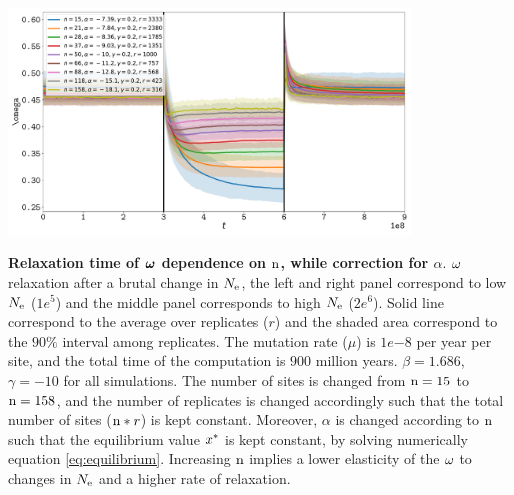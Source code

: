 \documentclass{article}
\begin{document}
\begin{center}
	\includegraphics[width=0.8\textwidth] {artworks/Relaxation-Stability-Alpha.pdf}
\end{center}
\textbf{Relaxation time of $\bm{\omega}$ dependence on $\text{n}$, while correction for $\alpha$}.
$\omega$ relaxation after a brutal change in $N_{\mathrm{e}}$, the left and right panel correspond to low $N_{\mathrm{e}}$ ($1e^{5}$) and the middle panel corresponds to high $N_{\mathrm{e}}$ ($2e^{6}$). 
Solid line correspond to the average over replicates ($r$) and the shaded area correspond to the $90\%$ interval among replicates. 
The mutation rate ($\mu$) is $1e{-8}$ per year per site, and the total time of the computation is $900$ million years.
$\beta=1.686$, $\gamma=-10$ for all simulations. The number of sites is changed from $\text{n}=15$ to $\text{n}=158$, and the number of replicates is changed accordingly such that the total number of sites ($\text{n}*r$) is kept constant.
Moreover, $\alpha$ is changed according to $\text{n}$ such that the equilibrium value $x^{*}$ is kept constant, by solving numerically equation \ref{eq:equilibrium}.
Increasing $\text{n}$ implies a lower elasticity of the $\omega$ to changes in $N_{\mathrm{e}}$ and a higher rate of relaxation.
\end{document}
